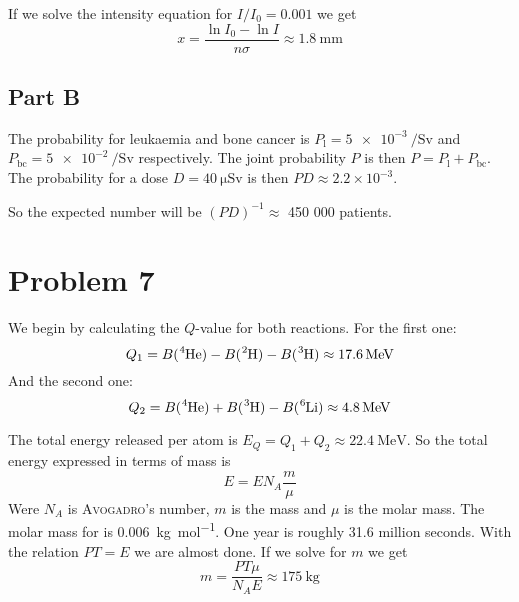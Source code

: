 \documentclass[a4paper, parskip=half, twopage]{scrartcl}
\begin{document}
If we solve the intensity equation for $I/I_0 = 0.001$ we get
\[
x = \frac{\ln I_0 - \ln I}{n \sigma} \approx \SI{1.8}{\mm}
\]

\subsection*{Part B}

The probability for leukaemia and bone cancer is $P_\mathrm{l} = \SI{5e-3}{\per\sievert}$ and $P_\mathrm{bc} = \SI{5e-2}{\per\sievert}$ respectively. The joint probability $P$ is then $P = P_\mathrm{l} + P_\mathrm{bc}$. The probability for a dose $D = \SI{40}{\micro \sievert}$ is then $PD \approx 2.2 \times 10^{-3}$.

So the expected number will be $(PD)^{-1} \approx$ 450 000 patients.

\section*{Problem 7}
We begin by calculating the $Q$-value for both reactions. For the first one:
\[
Q_1 = B(\ce{^{4}He}) - B(\ce{^{2}H}) - B(\ce{^{3}H}) \approx \SI{17.6}{\MeV}
\]
And the second one:
\[
Q_2 = B(\ce{^{4}He}) + B(\ce{^{3}H}) - B(\ce{^{6}Li}) \approx \SI{4.8}{\MeV}
\]

The total energy released per  atom is $E_Q = Q_1 + Q_2 \approx \SI{22.4}{\MeV}$. So the total energy expressed in terms of mass is 
\[
E = E N_A \frac{m}{\mu}
\]
Were $N_A$ is \textsc{Avogadro}'s number, $m$ is the mass and $\mu$ is the molar mass. The molar mass for  is \SI{0.006}{\kg \per \mole}. One year is roughly 31.6 million seconds. With the relation $PT = E$ we are almost done. If we solve for $m$ we get
\[
m = \frac{P T \mu}{N_A E} \approx \SI{175}{\kg}
\]
\end{document}
